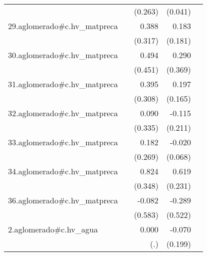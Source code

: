 {\begin{longtable}{l*{4}{D{.}{.}{-1}}}
            &                     &     (0.263)         &     (0.041)         &                     \\
\addlinespace
29.aglomerado#c.hv\_matpreca&                     &       0.388         &       0.183         &                     \\
            &                     &     (0.317)         &     (0.181)         &                     \\
\addlinespace
30.aglomerado#c.hv\_matpreca&                     &       0.494         &       0.290         &                     \\
            &                     &     (0.451)         &     (0.369)         &                     \\
\addlinespace
31.aglomerado#c.hv\_matpreca&                     &       0.395         &       0.197         &                     \\
            &                     &     (0.308)         &     (0.165)         &                     \\
\addlinespace
32.aglomerado#c.hv\_matpreca&                     &       0.090         &      -0.115         &                     \\
            &                     &     (0.335)         &     (0.211)         &                     \\
\addlinespace
33.aglomerado#c.hv\_matpreca&                     &       0.182         &      -0.020         &                     \\
            &                     &     (0.269)         &     (0.068)         &                     \\
\addlinespace
34.aglomerado#c.hv\_matpreca&                     &       0.824\sym{*}  &       0.619\sym{**} &                     \\
            &                     &     (0.348)         &     (0.231)         &                     \\
\addlinespace
36.aglomerado#c.hv\_matpreca&                     &      -0.082         &      -0.289         &                     \\
            &                     &     (0.583)         &     (0.522)         &                     \\
\addlinespace
2.aglomerado#c.hv\_agua&                     &       0.000         &      -0.070         &                     \\
            &                     &         (.)         &     (0.199)         &                     \\

\end{longtable}}
